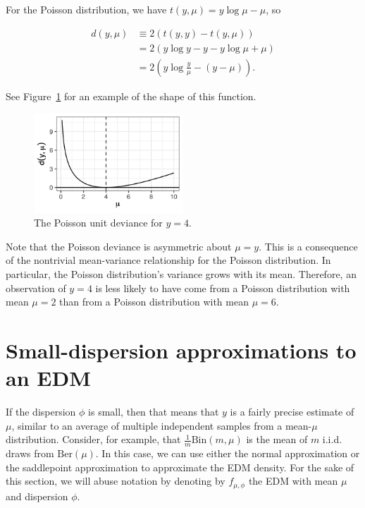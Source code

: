 \documentclass[
  11pt,
  letterpaper,
  oneside]{book}
\theoremstyle{plain}
\theoremstyle{plain}
\theoremstyle{definition}
\theoremstyle{definition}
\theoremstyle{plain}
\theoremstyle{remark}
\begin{document}
For the Poisson distribution, we have \(t(y, \mu) = y\log \mu - \mu\),
so

\[
\begin{split}
d(y, \mu) &\equiv 2(t(y, y) - t(y, \mu)) \\
&= 2(y\log y - y - y \log \mu + \mu) \\
&= 2\left(y\log \frac{y}{\mu} - (y - \mu)\right).
\end{split}
\]

See Figure~\ref{fig-poisson-unit-deviance} for an example of the shape
of this function.

\begin{figure}

{\centering \includegraphics[width=0.5\textwidth,height=\textheight]{figures/poisson-unit-deviance.png}

}

\caption{\label{fig-poisson-unit-deviance}The Poisson unit deviance for
\(y = 4\).}

\end{figure}

Note that the Poisson deviance is asymmetric about \(\mu = y\). This is
a consequence of the nontrivial mean-variance relationship for the
Poisson distribution. In particular, the Poisson distribution's variance
grows with its mean. Therefore, an observation of \(y = 4\) is less
likely to have come from a Poisson distribution with mean \(\mu = 2\)
than from a Poisson distribution with mean \(\mu = 6\).

\hypertarget{small-dispersion-approximations-to-an-edm}{%
\section{Small-dispersion approximations to an
EDM}\label{small-dispersion-approximations-to-an-edm}}

If the dispersion \(\phi\) is small, then that means that \(y\) is a
fairly precise estimate of \(\mu\), similar to an average of multiple
independent samples from a mean-\(\mu\) distribution. Consider, for
example, that \(\frac{1}{m}\text{Bin}(m, \mu)\) is the mean of \(m\)
i.i.d. draws from \(\text{Ber}(\mu)\). In this case, we can use either
the normal approximation or the saddlepoint approximation to approximate
the EDM density. For the sake of this section, we will abuse notation by
denoting by \(f_{\mu, \phi}\) the EDM with mean \(\mu\) and dispersion
\(\phi\).
\end{document}
